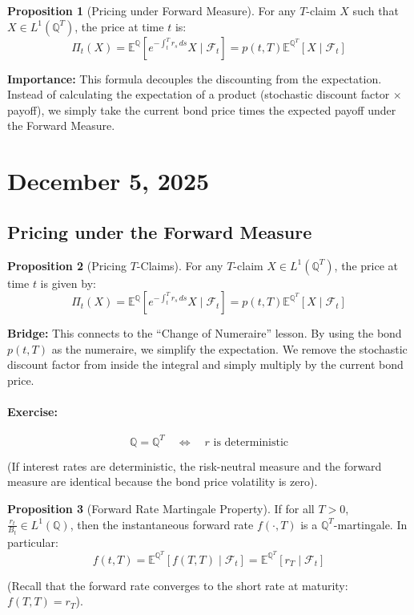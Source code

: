 \documentclass[12pt,a4paper]{article}
\theoremstyle{definition}
\newtheorem{proposition}{Proposition}[section]
\newcommand{\Q}{\mathbb{Q}}
\newcommand{\E}{\mathbb{E}}
\begin{document}
\begin{proposition}[Pricing under Forward Measure]
For any $T$-claim $X$ such that $X \in L^1(\Q^T)$, the price at time $t$ is:
\[
\Pi_t(X) = \E^{\Q}\left[e^{-\int_t^T r_s \, ds} X \mid \mathcal{F}_t\right] = p(t,T)\E^{\Q^T}[X \mid \mathcal{F}_t]
\]
\end{proposition}

\textbf{Importance:} This formula decouples the discounting from the expectation. Instead of calculating the expectation of a product (stochastic discount factor $\times$ payoff), we simply take the current bond price times the expected payoff under the Forward Measure.

\newpage
\section{December 5, 2025}

\subsection{Pricing under the Forward Measure}

\begin{proposition}[Pricing $T$-Claims]
For any $T$-claim $X \in L^1(\Q^T)$, the price at time $t$ is given by:
\[
\Pi_t(X) = \E^{\Q}\left[e^{-\int_t^T r_s \, ds} X \mid \mathcal{F}_t\right] = p(t,T)\E^{\Q^T}[X \mid \mathcal{F}_t]
\]
\end{proposition}

\textbf{Bridge:} This connects to the ``Change of Numeraire'' lesson. By using the bond $p(t,T)$ as the numeraire, we simplify the expectation. We remove the stochastic discount factor from inside the integral and simply multiply by the current bond price.

\paragraph{Exercise:}
\[
\Q = \Q^T \quad \Longleftrightarrow \quad r \text{ is deterministic}
\]

(If interest rates are deterministic, the risk-neutral measure and the forward measure are identical because the bond price volatility is zero).

\begin{proposition}[Forward Rate Martingale Property]
If for all $T > 0$, $\frac{r_t}{B_t} \in L^1(\Q)$, then the instantaneous forward rate $f(\cdot,T)$ is a $\Q^T$-martingale. In particular:
\[
f(t,T) = \E^{\Q^T}[f(T,T) \mid \mathcal{F}_t] = \E^{\Q^T}[r_T \mid \mathcal{F}_t] \tag{$*$}
\]

(Recall that the forward rate converges to the short rate at maturity: $f(T,T) = r_T$).
\end{proposition}
\end{document}

